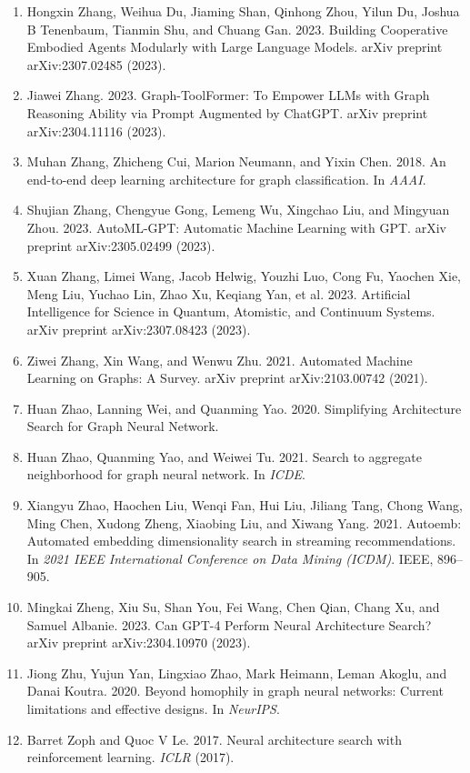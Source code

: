 \documentclass[11pt,UTF8,fontset=fandol]{ctexart}
\begin{document}
\begin{enumerate}[leftmargin=2em,labelsep=0.5em]
\item Hongxin Zhang, Weihua Du, Jiaming Shan, Qinhong Zhou, Yilun Du, Joshua B Tenenbaum, Tianmin Shu, and Chuang Gan. 2023. Building Cooperative Embodied Agents Modularly with Large Language Models. arXiv preprint arXiv:2307.02485 (2023).
\item Jiawei Zhang. 2023. Graph-ToolFormer: To Empower LLMs with Graph Reasoning Ability via Prompt Augmented by ChatGPT. arXiv preprint arXiv:2304.11116 (2023).
\item Muhan Zhang, Zhicheng Cui, Marion Neumann, and Yixin Chen. 2018. An end-to-end deep learning architecture for graph classification. In \textit{AAAI}.
\item Shujian Zhang, Chengyue Gong, Lemeng Wu, Xingchao Liu, and Mingyuan Zhou. 2023. AutoML-GPT: Automatic Machine Learning with GPT. arXiv preprint arXiv:2305.02499 (2023).
\item Xuan Zhang, Limei Wang, Jacob Helwig, Youzhi Luo, Cong Fu, Yaochen Xie, Meng Liu, Yuchao Lin, Zhao Xu, Keqiang Yan, et al. 2023. Artificial Intelligence for Science in Quantum, Atomistic, and Continuum Systems. arXiv preprint arXiv:2307.08423 (2023).
\item Ziwei Zhang, Xin Wang, and Wenwu Zhu. 2021. Automated Machine Learning on Graphs: A Survey. arXiv preprint arXiv:2103.00742 (2021).
\item Huan Zhao, Lanning Wei, and Quanming Yao. 2020. Simplifying Architecture Search for Graph Neural Network.
\item Huan Zhao, Quanming Yao, and Weiwei Tu. 2021. Search to aggregate neighborhood for graph neural network. In \textit{ICDE}.
\item Xiangyu Zhao, Haochen Liu, Wenqi Fan, Hui Liu, Jiliang Tang, Chong Wang, Ming Chen, Xudong Zheng, Xiaobing Liu, and Xiwang Yang. 2021. Autoemb: Automated embedding dimensionality search in streaming recommendations. In \textit{2021 IEEE International Conference on Data Mining (ICDM)}. IEEE, 896--905.
\item Mingkai Zheng, Xiu Su, Shan You, Fei Wang, Chen Qian, Chang Xu, and Samuel Albanie. 2023. Can GPT-4 Perform Neural Architecture Search? arXiv preprint arXiv:2304.10970 (2023).
\item Jiong Zhu, Yujun Yan, Lingxiao Zhao, Mark Heimann, Leman Akoglu, and Danai Koutra. 2020. Beyond homophily in graph neural networks: Current limitations and effective designs. In \textit{NeurIPS}.
\item Barret Zoph and Quoc V Le. 2017. Neural architecture search with reinforcement learning. \textit{ICLR} (2017).
\end{enumerate}
\end{document}
